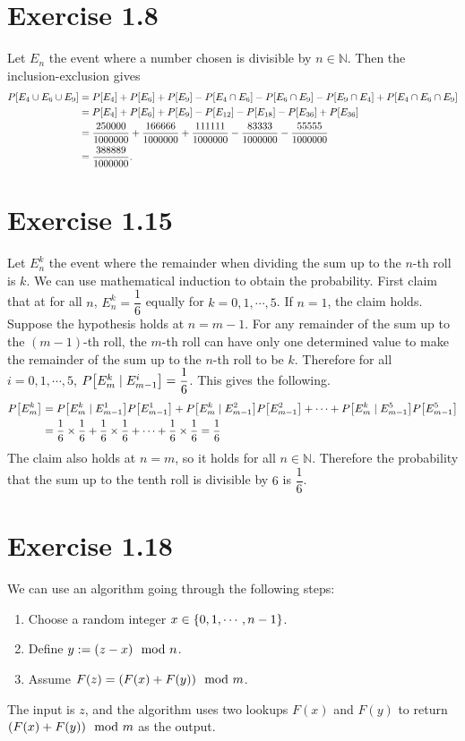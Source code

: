 \documentclass{article}
\begin{document}
\section*{Exercise 1.8}
Let $E_{n}$ the event where a number chosen is divisible by $n \in \mathbb{N}$. Then the inclusion-exclusion gives
\begin{align*}
  P\qty[E_4 \cup E_6 \cup E_9] &= P\qty[E_4] + P\qty[E_6] + P\qty[E_9] - P\qty[E_4 \cap E_6] - P\qty[E_6 \cap E_9] - P\qty[E_9 \cap E_4] + P\qty[E_4 \cap E_6 \cap E_9] \\
  &= P\qty[E_4] + P\qty[E_6] + P\qty[E_9] - P\qty[E_{12}] - P\qty[E_{18}] - P\qty[E_{36}] + P\qty[E_{36}] \\
  &= \frac{250000}{1000000} + \frac{166666}{1000000} + \frac{111111}{1000000} - \frac{83333}{1000000} - \frac{55555}{1000000} \\
  &= \frac{388889}{1000000}.
\end{align*}

\section*{Exercise 1.15}
Let $E_{n}^{k}$ the event where the remainder when dividing the sum up to the $n$-th roll is $k$.
We can use mathematical induction to obtain the probability.
First claim that at for all $n$, $E_n^k = \dfrac{1}{6}$ equally for $k = 0, 1, \cdots, 5$.
If $n = 1$, the claim holds.
Suppose the hypothesis holds at $n=m-1$.
For any remainder of the sum up to the $(m-1)$-th roll, the $m$-th roll can have only one determined value to make the remainder of the sum up to the $n$-th roll to be $k$. 
Therefore for all $i = 0, 1, \cdots, 5$, $P\qty[E_m^k \;|\; E_{m-1}^{i}] = \dfrac{1}{6}$. This gives the following.
\begin{align*}
  P\qty[E_m^k] &= P\qty[E_m^k \;|\; E_{m-1}^{1}]P\qty[E_{m-1}^1] + P\qty[E_m^k \;|\; E_{m-1}^{2}]P\qty[E_{m-1}^2] + \cdots + P\qty[E_m^k \;|\; E_{m-1}^{5}]P\qty[E_{m-1}^5] \\
  &= \frac{1}{6}\times\frac{1}{6} + \frac{1}{6}\times\frac{1}{6} + \cdots + \frac{1}{6}\times\frac{1}{6} = \frac{1}{6}
\end{align*}
The claim also holds at $n=m$, so it holds for all $n \in \mathbb{N}$. 
Therefore the probability that the sum up to the tenth roll is divisible by $6$ is $\dfrac{1}{6}$.

\section*{Exercise 1.18}
We can use an algorithm going through the following steps:
\begin{enumerate}
  \item Choose a random integer $x \in \qty{0, 1, \cdots , n-1}$.
  \item Define $y:= \qty(z - x) \mod{n}$.
  \item Assume $F(z) = \qty(F(x) + F(y)) \mod{m}$.
\end{enumerate}
The input is $z$, and the algorithm uses two lookups $F(x)$ and $F(y)$ to return $\qty(F(x) + F(y)) \mod{m}$ as the output.
\end{document}
